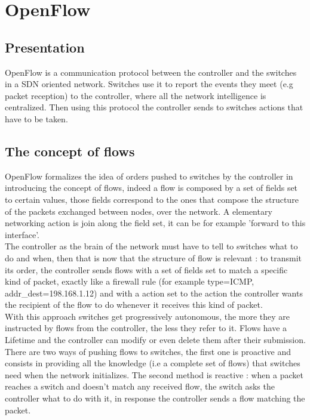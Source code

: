 \documentclass{article}
\begin{document}
\section{OpenFlow}

\subsection{Presentation}
OpenFlow is a communication protocol between the controller and the
switches in a SDN oriented network. Switches use it to report the
events they meet (e.g packet reception) to the controller, where all
the network intelligence is centralized. Then using this protocol the
controller sends to switches actions that have to be taken.

\subsection{The concept of flows}
OpenFlow formalizes the idea of orders pushed to switches by the
controller in introducing the concept of flows, indeed a flow is
composed by a set of fields set to certain values, those fields
correspond to the ones that compose the structure of the packets
exchanged between nodes, over the network. A elementary networking
action is join along the field set, it can be for example 'forward to
this interface'.\\
\newline
The controller as the brain of the network must have to tell to
switches what to do and when, then that is now that the structure of
flow is relevant : to transmit its order, the controller sends flows
with a set of fields set to match a specific kind of packet, exactly
like a firewall rule (for example type=ICMP, addr\_dest=198.168.1.12)
and with a action set to the action the controller wants the
recipient of the flow to do whenever it receives this kind of
packet.\\
\newline
With this approach switches get progressively autonomous, the more
they are instructed by flows from the controller, the less they refer
to it. Flows have a Lifetime and the controller can modify or even
delete them after their submission.  There are two ways of pushing
flows to switches, the first one is proactive and consists in
providing all the knowledge (i.e a complete set of flows) that
switches need when the network initializes.  The second method
is reactive : when a packet reaches a switch and doesn't match any
received flow, the switch asks the controller what to do with it, in
response the controller sends a flow matching the packet.
\end{document}
